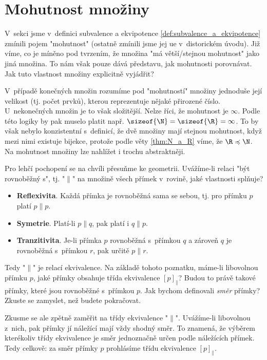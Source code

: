 \section{Mohutnost množiny}\label{sec:mohutnost_mnoziny}
V~sekci jsme v~definici subvalence a ekvipotence \ref{def:subvalence_a_ekvipotence} zmínili pojem "mohutnost" (ostatně zmínili jsme jej ue v~distorickém úvodu). Již víme, co je míněno pod tvrzením, že množina "má větší/stejnou mohutnost" jako jiná množina. To nám však pouze dává představu, jak mohutnosti porovnávat. Jak tuto vlastnost množiny explicitně vyjádřit?\par
V~případě konečných množin rozumíme pod "mohutností" množiny jednoduše její velikost (tj. počet prvků), kterou reprezentuje nějaké přirozené číslo. U~nekonečných množin je to však složitější. Nelze říci, že mohutnost je $\infty$. Podle této logiky by pak muselo platit např. $\sizeof{\N}=\sizeof{\R}=\infty$. To by však nebylo konzistentní s~definicí, že dvě množiny mají stejnou mohutnost, když mezi nimi existuje bijekce, protože podle věty \ref{thm:N_a_R} víme, že $\R\preccurlyeq\N$. Na mohutnost množiny lze nahlížet i trochu abstraktněji.
\medskip

Pro lehčí pochopení se na chvíli přesuňme ke geometrii. Uvážíme-li relaci "být rovnoběžný s", tj. "$\parallel$" na množině všech přímek v~rovině, jaké vlastnosti splňuje?
\begin{itemize}
    \item \textbf{Reflexivita}. Každá přímka je rovnoběžná sama se sebou, tj. pro přímku $p$ platí $p\parallel p$.
    \item \textbf{Symetrie}. Platí-li $p\parallel q$, pak platí i $q\parallel p$.
    \item \textbf{Tranzitivita}. Je-li přímka $p$ rovnoběžná s~přímkou $q$ a zároveň $q$ je rovnoběžná s~přímkou $r$, pak určitě $p\parallel r$.
\end{itemize}
Tedy "$\parallel$" je relací ekvivalence. Na základě tohoto poznatku, máme-li libovolnou přímku $p$, jaké přímky obsahuje třída ekvivalence $[p]_\parallel$? Budou to právě takové přímky, které jsou rovnoběžné s~přímkou $p$. Jak bychom definovali \emph{směr} přímky? Zkuste se zamyslet, než budete pokračovat.\par
Zkusme se ale zpětně zaměřit na třídy ekvivalence "$\parallel$". Uvážíme-li libovolnou z~nich, pak přímky jí náležící mají vždy shodný směr. To znamená, že výběrem kterékoliv třídy ekvivalence je směr jednoznačně určen podle náležících přímek. Tedy celkově: za směr přímky $p$ prohlásíme třídu ekvivalence $[p]_\parallel$.
\medskip

